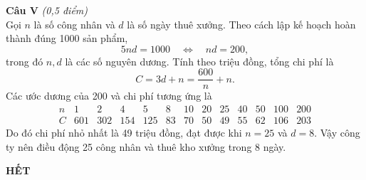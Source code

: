 \documentclass[12pt,a4paper]{article}
\newcommand{\diem}[1]{\textit{(#1 điểm)}}
\begin{document}
\textbf{Câu V} \diem{0,5}\\
Gọi $n$ là số công nhân và $d$ là số ngày thuê xưởng. Theo cách lập kế hoạch hoàn thành đúng 1000 sản phẩm,
\[
  5nd=1000\quad\Longleftrightarrow\quad nd=200,
\]
trong đó $n,d$ là các số nguyên dương. Tính theo triệu đồng, tổng chi phí là
\[
  C=3d+n=\frac{600}{n}+n.
\]
Các ước dương của 200 và chi phí tương ứng là
\[
\begin{array}{c|rrrrrrrrrrrr}
 n&1&2&4&5&8&10&20&25&40&50&100&200\\ \hline
 C&601&302&154&125&83&70&50&49&55&62&106&203
\end{array}
\]
Do đó chi phí nhỏ nhất là 49 triệu đồng, đạt được khi $n=25$ và $d=8$. Vậy công ty nên điều động 25 công nhân và thuê kho xưởng trong 8 ngày.

\begin{center}\textbf{HẾT}\end{center}
\end{document}
